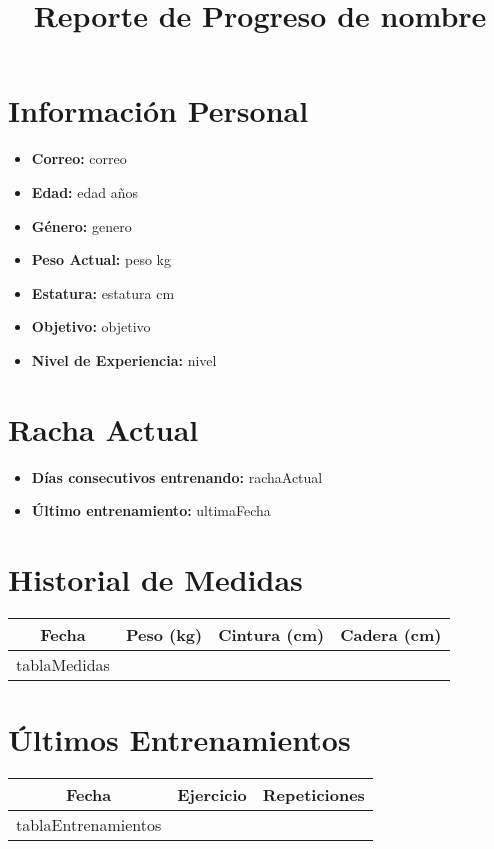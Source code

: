 \documentclass[12pt]{article}
\title{Reporte de Progreso de {{nombre}}}
\begin{document}
\maketitle

\section*{Información Personal}
\begin{itemize}
  \item \textbf{Correo:} {{correo}}
  \item \textbf{Edad:} {{edad}} años
  \item \textbf{Género:} {{genero}}
  \item \textbf{Peso Actual:} {{peso}} kg
  \item \textbf{Estatura:} {{estatura}} cm
  \item \textbf{Objetivo:} {{objetivo}}
  \item \textbf{Nivel de Experiencia:} {{nivel}}
\end{itemize}

\section*{Racha Actual}
\begin{itemize}
  \item \textbf{Días consecutivos entrenando:} {{rachaActual}}
  \item \textbf{Último entrenamiento:} {{ultimaFecha}}
\end{itemize}

\section*{Historial de Medidas}
\begin{longtable}{|c|c|c|c|}
\hline
Fecha & Peso (kg) & Cintura (cm) & Cadera (cm) \\
\hline
{{tablaMedidas}}
\hline
\end{longtable}

\section*{Últimos Entrenamientos}
\begin{longtable}{|c|c|c|}
\hline
Fecha & Ejercicio & Repeticiones \\
\hline
{{tablaEntrenamientos}}
\hline
\end{longtable}
\end{document}
